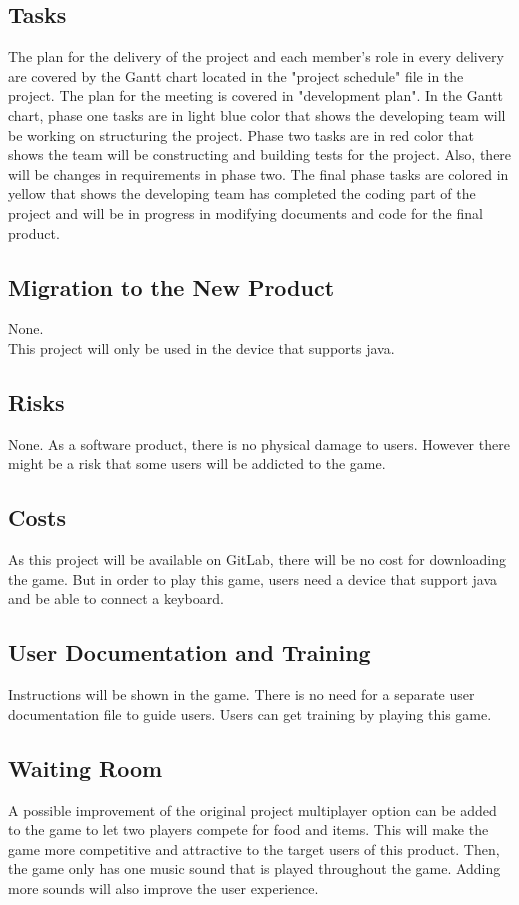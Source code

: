 \documentclass[12pt, titlepage]{article}
\begin{document}
\subsection{Tasks}
    The plan for the delivery of the project and each member's role in every delivery are covered by the Gantt chart located in the "project schedule" file in the project. The plan for the meeting is covered in "development plan". In the Gantt chart, phase one tasks are in light blue color that shows the developing team will be working on structuring the project. Phase two tasks are in red color that shows the team will be constructing and building tests for the project. Also, there will be changes in requirements in phase two. The final phase tasks are colored in yellow that shows the developing team has completed the coding part of the project and will be in progress in modifying documents and code for the final product.

\subsection{Migration to the New Product}
    None.\\This project will only be used in the device that supports java.
\subsection{Risks}
    None. As a software product, there is no physical damage to users. However there might be a risk that some users will be addicted to the game.
\subsection{Costs}
    As this project will be available on GitLab, there will be no cost for downloading the game. But in order to play this game, users need a device that support java and be able to connect a keyboard.
\subsection{User Documentation and Training}
    Instructions will be shown in the game. There is no need for a separate user documentation file to guide users. Users can get training by playing this game.
\subsection{Waiting Room}
	A possible improvement of the original project multiplayer option can be added to the game to let two players compete for food and items. This will make the game more competitive and attractive to the target users of this product. Then, the game only has one music sound that is played throughout the game. Adding more sounds will also improve the user experience.
\end{document}
